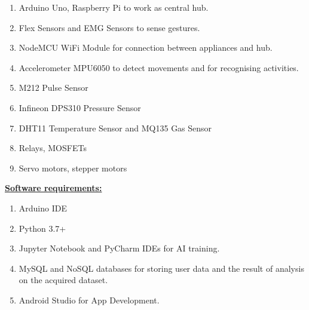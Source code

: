\documentclass[12pt]{article}
\begin{document}
\begin{enumerate}[label*={\fontsize{12pt}{12pt}\selectfont \arabic*.}]
	\item Arduino Uno, Raspberry Pi to work as central hub.\par

	\item Flex Sensors and EMG Sensors to sense gestures.\par

	\item NodeMCU WiFi Module for connection between appliances and hub.\par

	\item Accelerometer MPU6050 to detect movements and for recognising activities.\par

	\item M212 Pulse Sensor\par

	\item Infineon DPS310 Pressure Sensor\par

	\item DHT11 Temperature Sensor and MQ135 Gas Sensor\par

	\item Relays, MOSFETs\par

	\item Servo motors, stepper motors
\end{enumerate}\par


\vspace{\baselineskip}
{\fontsize{14pt}{16.8pt}\selectfont \textbf{\uline{Software requirements:}}\par}\par

\begin{enumerate}[label*={\fontsize{12pt}{12pt}\selectfont \arabic*.}]
	\item Arduino IDE\par

	\item Python 3.7+ \par

	\item Jupyter Notebook and PyCharm IDEs for AI training.\par

	\item MySQL and NoSQL databases for storing user data and the result of analysis on the acquired dataset.\par

	\item Android Studio for App Development.
\end{enumerate}\par
\end{document}
